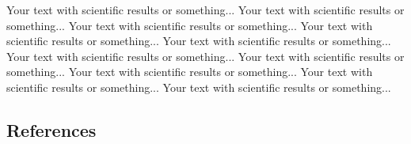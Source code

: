 \documentclass[final]{beamer}
\begin{document}
\begin{frame}[t]
\begin{multicols}{3}
Your text with scientific results or something... 
Your text with scientific results or something... 
Your text with scientific results or something... 
Your text with scientific results or something... 
Your text with scientific results or something... 
Your text with scientific results or something... 
Your text with scientific results or something... 
Your text with scientific results or something... 
Your text with scientific results or something... 
Your text with scientific results or something... 




\subsection{References}
{}



\end{multicols}

\end{frame}
\end{document}
